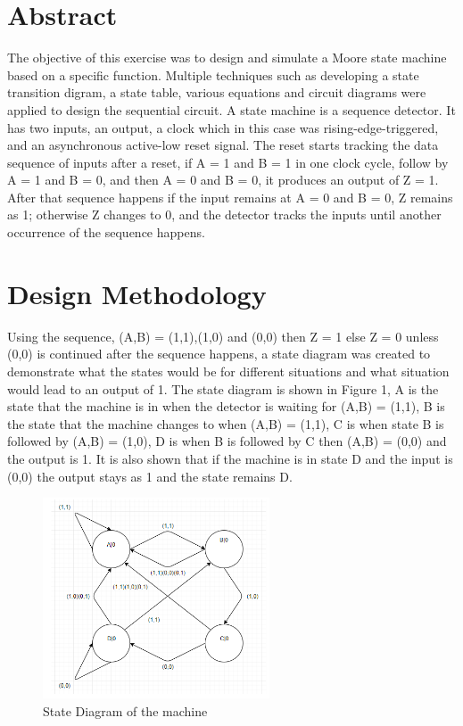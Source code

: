 \documentclass[CMPE]{KGCOEReport}
\begin{document}
\maketitle

\section*{Abstract}
The objective of this exercise was to design and simulate a Moore state machine based on a specific function. Multiple techniques such as developing a state transition digram, a state table, various equations and circuit diagrams were applied to design the sequential circuit. A state machine is a sequence detector. It has two inputs, an output, a clock which in this case was rising-edge-triggered, and an asynchronous active-low reset signal. The reset starts tracking the data sequence of inputs after a reset, if A = 1 and B = 1 in one clock cycle, follow by A = 1 and B = 0, and then A = 0 and B = 0, it produces an output of Z = 1. After that sequence happens if the input remains at A = 0 and B = 0, Z remains as 1; otherwise Z changes to 0, and the detector tracks the inputs until another occurrence of the sequence happens.

\section*{Design Methodology}
Using the sequence, (A,B) = (1,1),(1,0) and (0,0) then Z = 1 else Z = 0 unless (0,0) is continued after the sequence happens, a state diagram was created to demonstrate what the states would be for different situations and what situation would lead to an output of 1. The state diagram is shown in Figure 1, A is the state that the machine is in when the detector is waiting for (A,B) = (1,1), B is the state that the machine changes to when (A,B) = (1,1), C is when state B is followed by (A,B) = (1,0), D is when B is followed by C then (A,B) = (0,0) and the output is 1. It is also shown that if the machine is in state D and the input is (0,0) the output stays as 1 and the state remains D. 

\begin{figure}[H]
	\centering
	\includegraphics[width=0.6\textwidth]{StateDiagram}
	\caption{State Diagram of the machine}
	\label{fig:Figure 1}
\end{figure}
\end{document}
